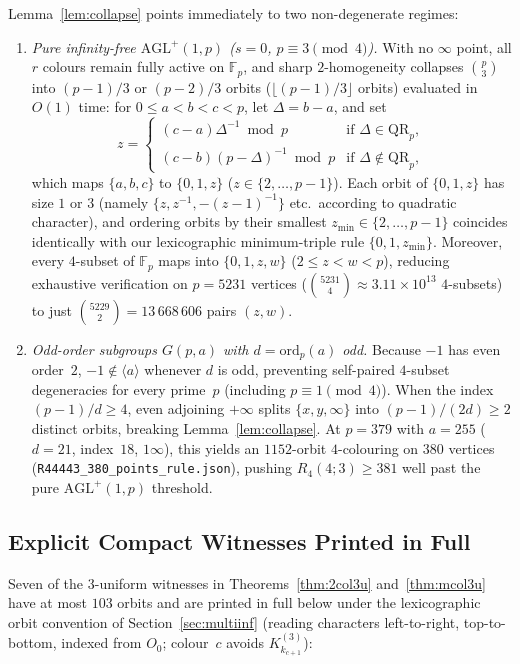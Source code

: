\documentclass[11pt]{article}
\theoremstyle{remark}
\newcommand{\F}{\mathbb{F}}
\begin{document}
Lemma~\ref{lem:collapse} points immediately to two non-degenerate regimes:
\begin{enumerate}
\item \emph{Pure infinity-free $\mathrm{AGL}^+(1,p)$ ($s=0$, $p\equiv 3\pmod 4$).}
  With no $\infty$ point, all $r$ colours remain fully active on $\F_p$, and
  sharp $2$-homogeneity collapses $\binom{p}{3}$ into $(p-1)/3$ or $(p-2)/3$
  orbits ($\lfloor(p-1)/3\rfloor$ orbits) evaluated in $O(1)$ time: for
  $0\le a<b<c<p$, let $\Delta=b-a$, and set
  \[
    z=\begin{cases}
      (c-a)\Delta^{-1}\bmod p & \text{if }\Delta\in\mathrm{QR}_p,\\
      (c-b)(p-\Delta)^{-1}\bmod p & \text{if }\Delta\notin\mathrm{QR}_p,
    \end{cases}
  \]
  which maps $\{a,b,c\}$ to $\{0,1,z\}$ ($z\in\{2,\dots,p-1\}$). Each orbit of
  $\{0,1,z\}$ has size $1$ or $3$ (namely $\{z,z^{-1},-(z-1)^{-1}\}$ etc.\
  according to quadratic character), and ordering orbits by their smallest
  $z_{\min}\in\{2,\dots,p-1\}$ coincides identically with our lexicographic
  minimum-triple rule $\{0,1,z_{\min}\}$. Moreover, every $4$-subset of $\F_p$
  maps into $\{0,1,z,w\}$ ($2\le z<w<p$), reducing exhaustive verification on
  $p=5231$ vertices ($\binom{5231}{4}\approx 3.11\times 10^{13}$ $4$-subsets)
  to just $\binom{5229}{2}=13\,668\,606$ pairs $(z,w)$.
\item \emph{Odd-order subgroups $G(p,a)$ with $d=\mathrm{ord}_p(a)$ odd.}
  Because $-1$ has even order~$2$, $-1\notin\langle a\rangle$ whenever $d$ is
  odd, preventing self-paired $4$-subset degeneracies for every prime~$p$
  (including $p\equiv 1\pmod 4$). When the index $(p-1)/d\ge 4$, even adjoining
  $+\infty$ splits $\{x,y,\infty\}$ into $(p-1)/(2d)\ge 2$ distinct orbits,
  breaking Lemma~\ref{lem:collapse}. At $p=379$ with $a=255$ ($d=21$, index~$18$,
  $1\infty$), this yields an $1152$-orbit $4$-colouring on $380$ vertices
  (\texttt{R44443\_380\_points\_rule.json}), pushing $R_4(4;3)\ge 381$ well past the
  pure $\mathrm{AGL}^+(1,p)$ threshold.
\end{enumerate}

\subsection{Explicit Compact Witnesses Printed in Full}

Seven of the $3$-uniform witnesses in Theorems~\ref{thm:2col3u} and~\ref{thm:mcol3u}
have at most $103$ orbits and are printed in full below under the lexicographic
orbit convention of Section~\ref{sec:multiinf} (reading characters left-to-right,
top-to-bottom, indexed from $O_0$; colour~$c$ avoids $K_{k_{c+1}}^{(3)}$):
\end{document}
